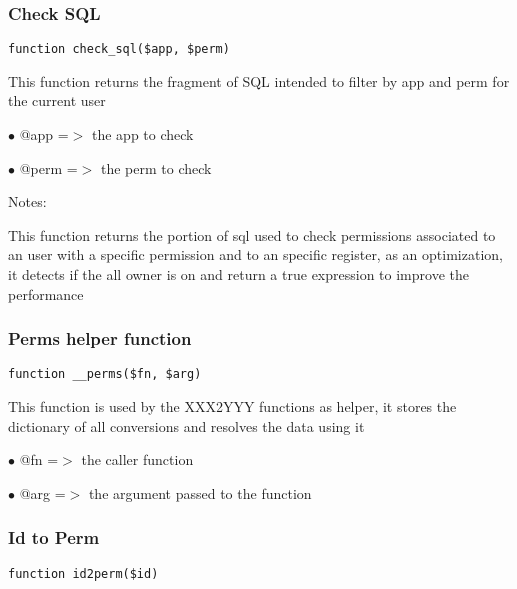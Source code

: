 \documentclass[a4paper]{article}
\begin{document}
\hypertarget{toc191}{}
\subsubsection{Check SQL}

\begin{lstlisting}
function check_sql($app, $perm)
\end{lstlisting}

This function returns the fragment of SQL intended to filter by app and
perm for the current user

\begin{compactitem}
\item[\color{myblue}$\bullet$] @app  =$>$ the app to check
\item[\color{myblue}$\bullet$] @perm =$>$ the perm to check
\end{compactitem}

Notes:

This function returns the portion of sql used to check permissions
associated to an user with a specific permission and to an specific
register, as an optimization, it detects if the all owner is on and
return a true expression to improve the performance

\hypertarget{toc192}{}
\subsubsection{Perms helper function}

\begin{lstlisting}
function __perms($fn, $arg)
\end{lstlisting}

This function is used by the XXX2YYY functions as helper, it stores the
dictionary of all conversions and resolves the data using it

\begin{compactitem}
\item[\color{myblue}$\bullet$] @fn  =$>$ the caller function
\item[\color{myblue}$\bullet$] @arg =$>$ the argument passed to the function
\end{compactitem}

\hypertarget{toc193}{}
\subsubsection{Id to Perm}

\begin{lstlisting}
function id2perm($id)
\end{lstlisting}
\end{document}
